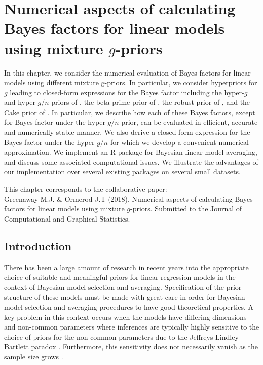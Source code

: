 
\chapter{Numerical aspects of calculating Bayes factors for linear models using
	mixture $g$-priors
	}



\noindent
In this chapter, we consider the numerical evaluation of Bayes factors for
linear models using different mixture g-priors. In particular, we consider
hyperpriors for $g$ leading to closed-form expressions for the Bayes factor
including the hyper-$g$ and hyper-$g/n$ priors of \cite{Liang2008}, the
beta-prime prior of \cite{Maruyama2011}, the robust prior of
\cite{Bayarri2012}, and the Cake prior of \cite{OrmerodEtal2017}. In
particular, we describe how each of these Bayes factors, except for Bayes
factor under the hyper-$g/n$ prior, can be evaluated in efficient, accurate and
numerically stable manner. We also derive a closed form expression for the
Bayes factor under the hyper-$g/n$ for which we develop a convenient numerical
approximation. We implement an R package for Bayesian linear model averaging,
and discuss some associated computational issues. We illustrate the advantages
of our implementation over several existing packages on several small datasets.


\vfill
{\footnotesize
\noindent	
	This chapter corresponds to the collaborative paper: \\
	Greenaway M.J. \& Ormerod J.T (2018).
	Numerical aspects of calculating Bayes factors for linear models using mixture $g$-priors. Submitted to the Journal of Computational and Graphical Statistics.
}

\newpage 

 
\section{Introduction}

 
There has been a large amount of research in recent years into the appropriate
choice of suitable and meaningful priors for linear regression models in the
context of Bayesian model selection and averaging. Specification of the prior
structure of these models must be made with great care in order for Bayesian
model selection and averaging procedures to have good theoretical properties.
A key problem in this context occurs when the models have differing dimensions
and non-common parameters where inferences are typically highly sensitive to
the choice of priors for the non-common parameters due to the
Jeffreys-Lindley-Bartlett paradox
\citep{Lindley1957,Bartlett1957,OrmerodEtal2017}.  Furthermore, this
sensitivity does not necessarily vanish as the sample size grows
\citep{Kass1995,Berger2001}.  

